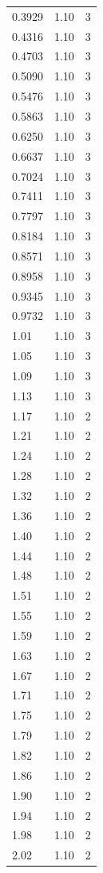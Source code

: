 \begin{longtable}{lrr}
  0.3929 & 1.10 & 3 \\
  0.4316 & 1.10 & 3 \\
  0.4703 & 1.10 & 3 \\
  0.5090 & 1.10 & 3 \\
  0.5476 & 1.10 & 3 \\
  0.5863 & 1.10 & 3 \\
  0.6250 & 1.10 & 3 \\
  0.6637 & 1.10 & 3 \\
  0.7024 & 1.10 & 3 \\
  0.7411 & 1.10 & 3 \\
  0.7797 & 1.10 & 3 \\
  0.8184 & 1.10 & 3 \\
  0.8571 & 1.10 & 3 \\
  0.8958 & 1.10 & 3 \\
  0.9345 & 1.10 & 3 \\
  0.9732 & 1.10 & 3 \\
  1.01 & 1.10 & 3 \\
  1.05 & 1.10 & 3 \\
  1.09 & 1.10 & 3 \\
  1.13 & 1.10 & 3 \\
  1.17 & 1.10 & 2 \\
  1.21 & 1.10 & 2 \\
  1.24 & 1.10 & 2 \\
  1.28 & 1.10 & 2 \\
  1.32 & 1.10 & 2 \\
  1.36 & 1.10 & 2 \\
  1.40 & 1.10 & 2 \\
  1.44 & 1.10 & 2 \\
  1.48 & 1.10 & 2 \\
  1.51 & 1.10 & 2 \\
  1.55 & 1.10 & 2 \\
  1.59 & 1.10 & 2 \\
  1.63 & 1.10 & 2 \\
  1.67 & 1.10 & 2 \\
  1.71 & 1.10 & 2 \\
  1.75 & 1.10 & 2 \\
  1.79 & 1.10 & 2 \\
  1.82 & 1.10 & 2 \\
  1.86 & 1.10 & 2 \\
  1.90 & 1.10 & 2 \\
  1.94 & 1.10 & 2 \\
  1.98 & 1.10 & 2 \\
  2.02 & 1.10 & 2 \\

\end{longtable}
